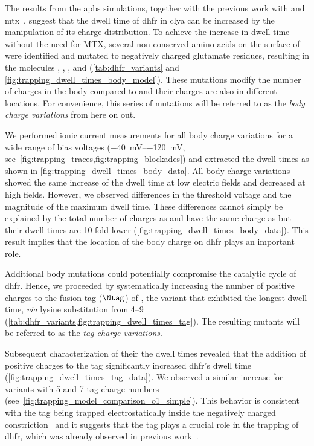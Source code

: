 The results from the \gls{apbs} simulations, together with the previous work with \DHFRt{} and
\gls{mtx}~\cite{Soskine-Biesemans-2015}, suggest that the dwell time of \gls{dhfr} in \gls{clya} can be
increased by the manipulation of its charge distribution. To achieve the increase in dwell time without the
need for MTX, several non-conserved amino acids on the surface of  were identified and mutated to
negatively charged glutamate residues, resulting in the molecules , , , and
 (\cref{tab:dhfr_variants} and \cref{fig:trapping_dwell_times_body_model}). These mutations modify
the number of charges in the body compared to  and their charges are also in different locations.
For convenience, this series of mutations will be referred to as the \emph{body charge variations} from here
on out.

We performed ionic current measurements for all body charge variations for a wide range of bias voltages
(\SIrange{-40}{-120}{\mV}, see~\cref{fig:trapping_traces,fig:trapping_blockades}) and extracted the dwell
times as shown in \cref{fig:trapping_dwell_times_body_data}. All body charge variations showed the same
increase of the dwell time at low electric fields and decreased at high fields. However, we observed
differences in the threshold voltage and the magnitude of the maximum dwell time. These differences cannot
simply be explained by the total number of charges as  and  have the same charge as
 but their dwell times are 10-fold lower (\cref{fig:trapping_dwell_times_body_data}). This result
implies that the location of the body charge on \gls{dhfr} plays an important role.

Additional body mutations could potentially compromise the catalytic cycle of \gls{dhfr}\@. Hence, we
proceeded by systematically increasing the number of positive charges to the fusion tag ($\Ntag$) of
, the variant that exhibited the longest dwell time, \textit{via} lysine substitution from
\SIrange{+4}{+9}{\ec} (\cref{tab:dhfr_variants,fig:trapping_dwell_times_tag}). The resulting
 mutants  will be referred to as the \emph{tag charge variations}.

Subsequent characterization of their the dwell times revealed that the addition of positive charges to the tag
significantly increased \gls{dhfr}'s dwell time (\cref{fig:trapping_dwell_times_tag_data}). We observed a
similar increase for  variants with \num{+5} and \num{+7} tag charge numbers
(see~\cref{fig:trapping_model_comparison_o1_simple}). This behavior is consistent with the tag being trapped
electrostatically inside the negatively charged \transi{}
constriction~\cite{Franceschini-2016,Movileanu-2005,Asandei-2015,Asandei-2016} and it suggests that the tag
plays a crucial role in the trapping of \gls{dhfr}, which was already observed in previous
work~\cite{Soskine-Biesemans-2015}.

